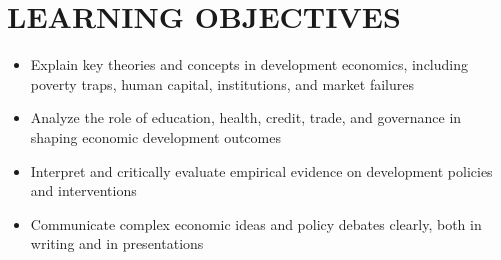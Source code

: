 \documentclass[11pt]{article}
\begin{document}
\section*{LEARNING OBJECTIVES}
\begin{itemize}
    \item[\faCheckSquareO] Explain key theories and concepts in development economics, including poverty traps, human capital, institutions, and market failures
    \item[\faCheckSquareO] Analyze the role of education, health, credit, trade, and governance in shaping economic development outcomes
    \item[\faCheckSquareO] Interpret and critically evaluate empirical evidence on development policies and interventions
    \item[\faCheckSquareO] Communicate complex economic ideas and policy debates clearly, both in writing and in presentations
\end{itemize}
\end{document}
